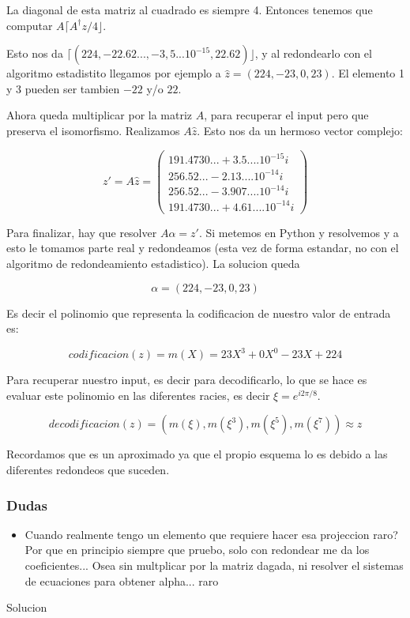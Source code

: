 \documentclass[12pt, oneside]{article}
\begin{document}
La diagonal de esta matriz al cuadrado es siempre 4.
Entonces tenemos que computar $A\lceil A^\dagger z/4  \rfloor$.

Esto nos da $\lceil(224, -22.62..., -3,5...10^{-15}, 22.62)\rfloor$, y al redondearlo
con el algoritmo estadistito llegamos por ejemplo a $\hat{z}=(224, -23, 0, 23)$.
El elemento 1 y 3 pueden ser tambien $-22$ y/o $22$.


Ahora queda multiplicar por la matriz $A$, para recuperar el input pero que preserva
el isomorfismo.
Realizamos $A\hat{z}$.
Esto nos da un hermoso vector complejo:

\begin{equation*}
    z'= A\hat{z}=
    \begin{pmatrix}
        191.4730... + 3.5....10^{-15}i \\
        256.52... - 2.13....10^{-14}i \\
        256.52... - 3.907....10^{-14}i \\
        191.4730... + 4.61....10^{-14}i
    \end{pmatrix}
    \label{eq:vandermonde_ej}
\end{equation*}

Para finalizar, hay que resolver $A\alpha = z'$.
Si metemos en Python y resolvemos y a esto le tomamos parte real y redondeamos
(esta vez de forma estandar, no con el algoritmo de redondeamiento estadistico).
La solucion queda

\begin{equation*}
    \alpha = (224, -23, 0, 23)
\end{equation*}

Es decir el polinomio que representa la codificacion de nuestro valor de entrada es:


\begin{equation*}
    codificacion(z) = m(X) = 23X^3+0X^0-23X+224
\end{equation*}

Para recuperar nuestro input, es decir para decodificarlo, lo que se hace es
evaluar este polinomio en las diferentes racies, es decir $\xi=e^{i2\pi/8 }$.

\begin{equation*}
    decodificacion(z) = ( m(\xi), m(\xi^3), m(\xi^5), m(\xi^7)) \approx z
\end{equation*}

Recordamos que es un aproximado ya que el propio esquema lo es debido a las diferentes
redondeos que suceden.

\subsubsection{Dudas}
\begin{itemize}
  \item Cuando realmente tengo un elemento que requiere hacer esa projeccion raro? Por que en principio siempre que pruebo, solo con redondear me da los coeficientes...
  Osea sin multplicar por la matriz dagada, ni resolver el sistemas de ecuaciones para obtener alpha... raro
\end{itemize}
Solucion
\end{document}
